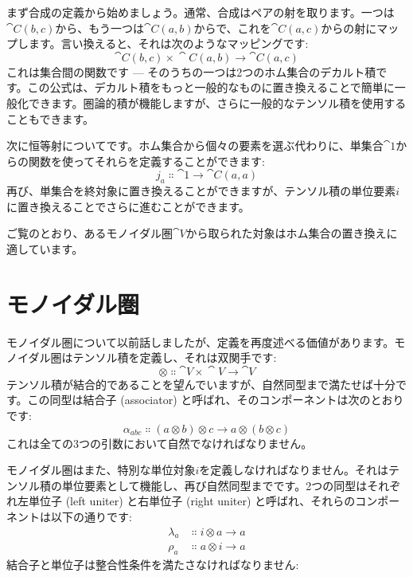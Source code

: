 まず合成の定義から始めましょう。通常、合成はペアの射を取ります。一つは$\cat{C}(b, c)$から、もう一つは$\cat{C}(a, b)$からで、これを$\cat{C}(a, c)$からの射にマップします。言い換えると、それは次のようなマッピングです: 
\[\cat{C}(b, c)\times{}\cat{C}(a, b) \to \cat{C}(a, c)\]
これは集合間の関数です --- そのうちの一つは2つのホム集合のデカルト積です。この公式は、デカルト積をもっと一般的なものに置き換えることで簡単に一般化できます。圏論的積が機能しますが、さらに一般的なテンソル積を使用することもできます。

次に恒等射についてです。ホム集合から個々の要素を選ぶ代わりに、単集合$\cat{1}$からの関数を使ってそれらを定義することができます: 
\[j_a \Colon \cat{1} \to \cat{C}(a, a)\]
再び、単集合を終対象に置き換えることができますが、テンソル積の単位要素$i$に置き換えることでさらに進むことができます。

ご覧のとおり、あるモノイダル圏$\cat{V}$から取られた対象はホム集合の置き換えに適しています。

\section{モノイダル圏}

モノイダル圏について以前話しましたが、定義を再度述べる価値があります。モノイダル圏はテンソル積を定義し、それは双関手です: 
\[\otimes \Colon \cat{V}\times{}\cat{V} \to \cat{V}\]
テンソル積が結合的であることを望んでいますが、自然同型まで満たせば十分です。この同型は結合子 (associator) と呼ばれ、そのコンポーネントは次のとおりです: 
\[\alpha_{a b c} \Colon (a \otimes b) \otimes c \to a \otimes (b \otimes c)\]
これは全ての3つの引数において自然でなければなりません。

モノイダル圏はまた、特別な単位対象$i$を定義しなければなりません。それはテンソル積の単位要素として機能し、再び自然同型までです。2つの同型はそれぞれ左単位子 (left uniter) と右単位子 (right uniter) と呼ばれ、それらのコンポーネントは以下の通りです: 
\begin{align*}
  \lambda_a & \Colon i \otimes a \to a \\
  \rho_a    & \Colon a \otimes i \to a
\end{align*}
結合子と単位子は整合性条件を満たさなければなりません: 

\begin{figure}[H]
  \centering
\end{figure}

